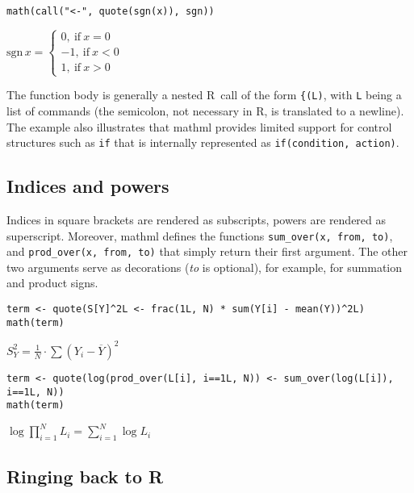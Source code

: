 \begin{verbatim}
math(call("<-", quote(sgn(x)), sgn))
\end{verbatim}

\({\mathrm{sgn}\,{x}}{=}{\left\{\begin{array}{l}{{0},\ \mathrm{if}\ {{x}{=}{0}}}\\ {{{-}{1}},\ \mathrm{if}\ {{x}{<}{0}}}\\ {{1},\ \mathrm{if}\ {{x}{>}{0}}}\end{array}\right.}\)

The function body is generally a nested R~call of the form \texttt{\{(L)}, with
\texttt{L} being a list of commands (the semicolon, not necessary in R, is
translated to a newline). The example also illustrates that mathml
provides limited support for control structures such as \texttt{if} that is
internally represented as \texttt{if(condition,~action)}.

\hypertarget{indices-and-powers}{%
\subsection{Indices and powers}\label{indices-and-powers}}

Indices in square brackets are rendered as subscripts, powers are
rendered as superscript. Moreover, mathml defines the functions
\texttt{sum\_over(x,~from,~to)}, and \texttt{prod\_over(x,~from,~to)} that simply return
their first argument. The other two arguments serve as decorations (\emph{to}
is optional), for example, for summation and product signs.

\begin{verbatim}
term <- quote(S[Y]^2L <- frac(1L, N) * sum(Y[i] - mean(Y))^2L)
math(term)
\end{verbatim}

\({{S}_{Y}^{2}}{=}{{\frac{1}{N}}{\cdot}{{\sum{\left({{Y}_{i}}{-}{\overline{Y}}\right)}}^{2}}}\)

\begin{verbatim}
term <- quote(log(prod_over(L[i], i==1L, N)) <- sum_over(log(L[i]), i==1L, N))
math(term)
\end{verbatim}

\({\log{{\prod}_{{i}{=}{1}}^{N}{{L}_{i}}}}{=}{{\sum}_{{i}{=}{1}}^{N}{\log{{L}_{i}}}}\)

\hypertarget{ringing-back-to-r}{%
\subsection{Ringing back to R}\label{ringing-back-to-r}}

